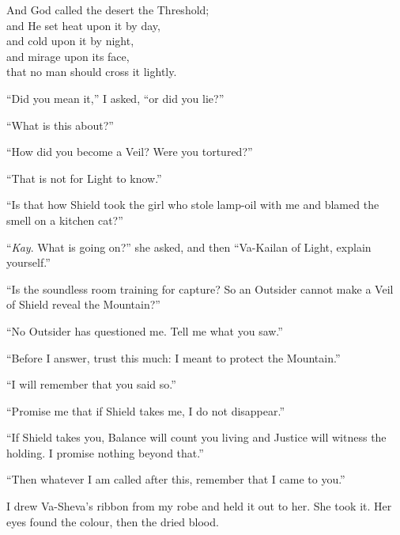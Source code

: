 \begin{scripture}
And God called the desert the Threshold; \\
and He set heat upon it by day, \\
and cold upon it by night, \\
and mirage upon its face, \\
that no man should cross it lightly.\par
\end{scripture}

``Did you mean it,'' I asked, ``or did you lie?''\par

``What is this about?''\par

``How did you become a Veil? Were you tortured?''\par

``That is not for Light to know.''\par

``Is that how Shield took the girl who stole lamp-oil with me and blamed the smell on a kitchen cat?''\par

``\textit{Kay}. What is going on?'' she asked, and then ``Va-Kailan of Light, explain yourself.''\par

``Is the soundless room training for capture? So an Outsider cannot make a Veil of Shield reveal the Mountain?''\par

``No Outsider has questioned me. Tell me what you saw.''\par

``Before I answer, trust this much: I meant to protect the Mountain.''\par

``I will remember that you said so.''\par

``Promise me that if Shield takes me, I do not disappear.''\par

``If Shield takes you, Balance will count you living and Justice will witness the holding. I promise nothing beyond that.''\par

``Then whatever I am called after this, remember that I came to you.''\par

I drew Va-Sheva's ribbon from my robe and held it out to her. She took it. Her eyes found the colour, then the dried blood.\par

